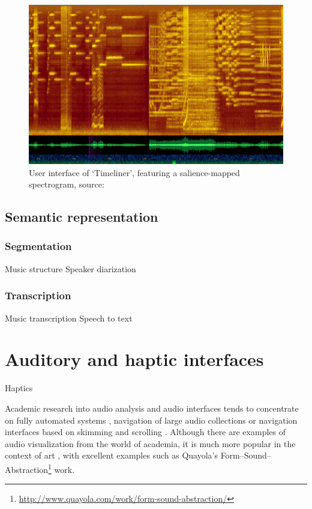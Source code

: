 \begin{figure}[ht]
  \centering
  \includegraphics[width=0.95\linewidth]{figs/timeliner.png}
  \caption{User interface of `Timeliner', featuring a salience-mapped
    spectrogram, source: \citep{Goudeseune2012}}
  \label{fig:timeliner}
\end{figure}


\subsection{Semantic representation}

\subsubsection{Segmentation}
Music structure
Speaker diarization

\subsubsection{Transcription}
Music transcription
Speech to text

\section{Auditory and haptic interfaces}\label{sec:background-auditory}
Haptics


Academic research into audio analysis and audio interfaces tends to concentrate
on fully automated systems \citep{AngueraMiro2012}, navigation of large audio
collections \citep{FontCorbera2010} or navigation interfaces based on skimming
\citep{Arons1997} and scrolling \citep{Lee2007}. Although there are examples of
audio visualization from the world of academia, it is much more popular in the
context of art \citep{Armitage2012}, with excellent examples such as Quayola's
Form--Sound--Abstraction\footnote{\url{http://www.quayola.com/work/form-sound-abstraction/}}
work.

